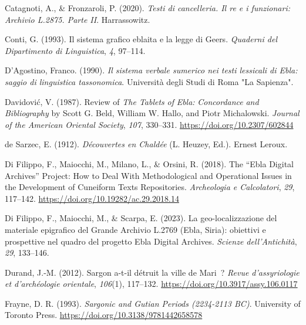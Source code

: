\documentclass[
]{book}
\newlength{\cslhangindent}
\newlength{\cslentryspacingunit} %
\newenvironment{CSLReferences}[2] %
 {%
  \setlength{\parindent}{0pt}
  \ifodd #1
  \let\oldpar\par
  \def\par{\hangindent=\cslhangindent\oldpar}
  \fi
  \setlength{\parskip}{#2\cslentryspacingunit}
 }%
 {}
\begin{document}
\begin{CSLReferences}{1}{0}
\leavevmode{}%
Catagnoti, A., \& Fronzaroli, P. (2020). \emph{{Testi di cancelleria. Il re e i funzionari: Archivio L.2875. Parte II}}. Harrassowitz.

\leavevmode{}%
Conti, G. (1993). {Il sistema grafico eblaita e la legge di Geers}. \emph{Quaderni del Dipartimento di Linguistica}, \emph{4}, 97--114.

\leavevmode{}%
D'Agostino, Franco. (1990). \emph{{Il sistema verbale sumerico nei testi lessicali di Ebla: saggio di linguistica tassonomica}}. Universit{à} degli Studi di Roma "La Sapienza".

\leavevmode{}%
Davidović, V. (1987). Review of {\emph{The Tablets}}{ \emph{of} }{\emph{Ebla}}{\emph{:} }{\emph{Concordance}}{ \emph{and} }{\emph{Bibliography}} by {Scott G}. {Beld}, {William W}. {Hallo}, and {Piotr Michalowski}. \emph{Journal of the American Oriental Society}, \emph{107}, 330--331. \url{https://doi.org/10.2307/602844}

\leavevmode{}%
de Sarzec, E. (1912). \emph{{D{é}couvertes en Chald{é}e}} (L. Heuzey, Ed.). Ernest Leroux.

\leavevmode{}%
Di Filippo, F., Maiocchi, M., Milano, L., \& Orsini, R. (2018). {The {``Ebla Digital Archives''} Project: How to Deal With Methodological and Operational Issues in the Development of Cuneiform Texts Repositories}. \emph{Archeologia e Calcolatori}, \emph{29}, 117--142. \url{https://doi.org/10.19282/ac.29.2018.14}

\leavevmode{}%
Di Filippo, F., Maiocchi, M., \& Scarpa, E. (2023). {La geo-localizzazione del materiale epigrafico del Grande Archivio L.2769 (Ebla, Siria): obiettivi e prospettive nel quadro del progetto Ebla Digital Archives}. \emph{Scienze dell'Antichit{à}}, \emph{29}, 133--146.

\leavevmode{}%
Durand, J.-M. (2012). {Sargon a-t-il d{é}truit la ville de Mari~?} \emph{Revue d'assyriologie et d'arch{é}ologie orientale}, \emph{106}(1), 117--132. \url{https://doi.org/10.3917/assy.106.0117}

\leavevmode{}%
Frayne, D. R. (1993). \emph{Sargonic and {Gutian Periods} (2234-2113 {BC})}. University of Toronto Press. \url{https://doi.org/10.3138/9781442658578}


\end{CSLReferences}
\end{document}

